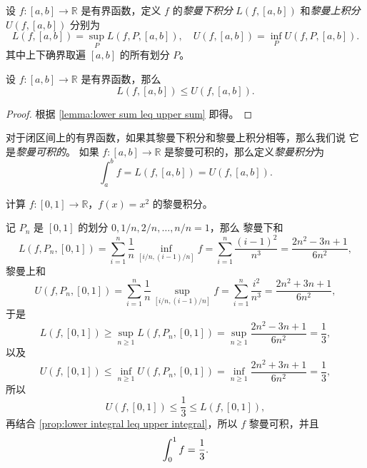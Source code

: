 \documentclass[fontset=none]{Notes}
\begin{document}
\begin{definition}
  设 $f:[a,b]\to \mathbb{R}$ 是有界函数，定义 $f$ 的\emph{黎曼下积分}
  $L(f,[a,b])$ 和\emph{黎曼上积分} $U(f,[a,b])$ 分别为
  \begin{equation*}
    L(f,[a,b])=\sup_P L(f,P,[a,b]),\quad  
    U(f,[a,b])=\inf_P U(f,P,[a,b]).
  \end{equation*}
  其中上下确界取遍 $[a,b]$ 的所有划分 $P$。
\end{definition}

\begin{proposition}[黎曼下积分小于黎曼上积分]\label{prop:lower integral leq upper integral}
  设 $f:[a,b]\to \mathbb{R}$ 是有界函数，那么
  \[
    L(f,[a,b])\leq U(f,[a,b]).
  \]
\end{proposition}
\begin{proof}
  根据 \autoref{lemma:lower sum leq upper sum} 即得。
\end{proof}

\begin{definition}
  对于闭区间上的有界函数，如果其黎曼下积分和黎曼上积分相等，那么我们说
  它是\emph{黎曼可积的}。
  如果 $f:[a,b]\to \mathbb{R}$ 是黎曼可积的，那么定义\emph{黎曼积分}为
  \[
    \int_a^b f =L(f,[a,b])=U(f,[a,b]).
  \]
\end{definition}

\begin{example}\label{exa:integral of x2}
  计算 $f:[0,1]\to \mathbb{R}$，$f(x)=x^2$ 的黎曼积分。
\end{example}
\begin{solution}
  记 $P_n$ 是 $[0,1]$ 的划分 $0,1/n,2/n,\dots,n/n=1$，那么
  黎曼下和
  \[
    L(f,P_n,[0,1])=\sum_{i=1}^n\frac{1}{n}\inf_{[i/n,(i-1)/n]} f=
    \sum_{i=1}^n \frac{(i-1)^2}{n^3}=\frac{2n^2-3n+1}{6n^2},
  \]
  黎曼上和
  \[
    U(f,P_n,[0,1])=\sum_{i=1}^n\frac{1}{n}\sup_{[i/n,(i-1)/n]} f=
    \sum_{i=1}^n \frac{i^2}{n^3}=\frac{2n^2+3n+1}{6n^2},
  \]
  于是
  \[
    L(f,[0,1])\geq \sup_{n\geq 1} L(f,P_n,[0,1])=
    \sup_{n\geq 1}\frac{2n^2-3n+1}{6n^2}=\frac{1}{3},
  \]
  以及
  \[
    U(f,[0,1])\leq \inf_{n\geq 1} U(f,P_n,[0,1])=
    \inf_{n\geq 1} \frac{2n^2+3n+1}{6n^2}=\frac{1}{3},
  \]
  所以
  \[
    U(f,[0,1])\leq \frac{1}{3}\leq L(f,[0,1]),
  \]
  再结合 \autoref{prop:lower integral leq upper integral}，所以
  $f$ 黎曼可积，并且
  \[
    \int_0^1 f=\frac{1}{3}.\qedhere
  \]
\end{solution}
\end{document}
